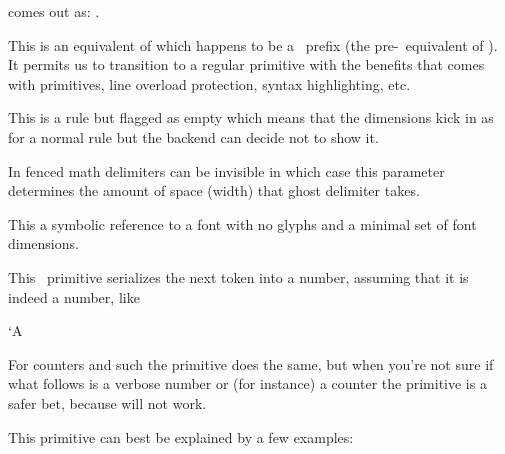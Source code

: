 comes out as: \inlinebuffer.

\stopnewprimitive

\startnewprimitive[title={\prm {notexpanded}}]

This is an equivalent of \type {\unexpanded} which happens to be a \CONTEXT\
prefix (the pre-\ETEX\ equivalent of ). It permits us to
transition to a regular primitive with the benefits that comes with primitives,
line overload protection, syntax highlighting, etc.

\stopnewprimitive

\startnewprimitive[title={\prm {novrule}}]

This is a rule but flagged as empty which means that the dimensions kick in as
for a normal rule but the backend can decide not to show it.

\stopnewprimitive

\startoldprimitive[title={\prm {nulldelimiterspace}}]

In fenced math delimiters can be invisible in which case this parameter
determines the amount of space (width) that ghost delimiter takes.

\stopoldprimitive

\startoldprimitive[title={\prm {nullfont}}]

This a symbolic reference to a font with no glyphs and a minimal set of font
dimensions.

\stopoldprimitive

\startoldprimitive[title={\prm {number}}]

This \TEX\ primitive serializes the next token into a number, assuming that it
is indeed a number, like

\starttyping
\number`A
\number\scratchcounter
\stoptyping

For counters and such the  primitive does the same, but when you're
not sure if what follows is a verbose number or (for instance) a counter the
\prm {number} primitive is a safer bet, because \type {\the 65} will not work.

\stopoldprimitive

\startnewprimitive[title={\prm {numericscale}}]

This primitive can best be explained by a few examples:

\startbuffer
\the{}
\the{}
\the{}
\the{}
\stopbuffer

\typebuffer

